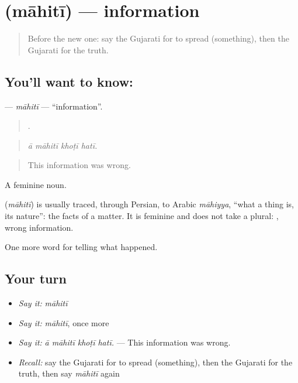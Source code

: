 \section[\texorpdfstring{\gu{માહિતી} (māhitī)}{માહિતી (māhitī)}]{ (māhitī) — information}

\label{lesson:GU-C313-mahiti}



\begin{quote}
Before the new one: say the Gujarati for to spread (something), then the Gujarati for the truth.
\end{quote}

\subsection*{You'll want to know: }
\textbf{} — \emph{māhitī} — \textquotedblleft{}information\textquotedblright{}.

\begin{quote}
   .
\end{quote}

\begin{quote}
\emph{ā māhitī khoṭī hatī.}
\end{quote}

\begin{quote}
This information was wrong.
\end{quote}

A feminine noun.

\begin{cousinweb}
\textbf{} (\emph{māhitī}) is usually traced, through Persian, to Arabic \emph{māhiyya}, \textquotedblleft{}what a thing is, its nature\textquotedblright{}: the facts of a matter. It is feminine and does not take a plural: \textbf{ }, wrong information.
\end{cousinweb}

\begin{grammarlens}[title={What you've built}]
One more word for telling what happened.
\end{grammarlens}

\subsection*{Your turn}
\begin{itemize}
\raggedright
  \item \emph{Say it:} \emph{māhitī}
  \item \emph{Say it:} \emph{māhitī}, once more
  \item \emph{Say it:} \emph{ā māhitī khoṭī hatī.} — This information was wrong.
  \item \emph{Recall:} say the Gujarati for to spread (something), then the Gujarati for the truth, then say \emph{māhitī} again
\end{itemize}

